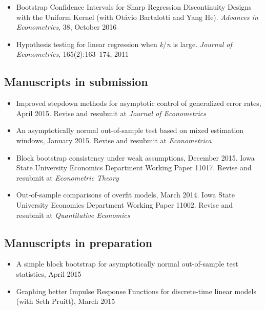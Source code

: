 \documentclass[12pt]{article}%
\begin{document}
\begin{itemize}
\item Bootstrap Confidence Intervals for Sharp Regression
Discontinuity Designs with the Uniform Kernel (with Ot\'avio Bartalotti
and Yang He). \textit{Advances in Econometrics}, 38, October 2016
\item Hypothesis testing for linear regression when
\textit{k}/\textit{n} is large. \textit{Journal of Econometrics},
165(2):163--174, 2011
\end{itemize}

\subsection*{Manuscripts in submission}

\begin{itemize}
\item Improved stepdown methods for asymptotic control of generalized
error rates, April 2015. Revise and resubmit at \textit{Journal of
Econometrics}
\item An asymptotically normal out-of-sample test based on mixed
estimation windows, January 2015. Revise and resubmit at
\textit{Econometrica}
\item Block bootstrap consistency under weak assumptions, December
2015.  Iowa State University Economics Department Working Paper
11017. Revise and resubmit at \textit{Econometric Theory}
\item Out-of-sample comparisons of overfit models, March 2014. Iowa
State University Economics Department Working Paper 11002. Revise and
resubmit at \textit{Quantitative Economics}
\end{itemize}

\subsection*{Manuscripts in preparation}
\begin{itemize}
\item A simple block bootstrap for asymptotically normal out-of-sample
  test statistics, April 2015
\item Graphing better Impulse Response Functions for discrete-time
  linear models (with Seth Pruitt), March 2015
\end{itemize}
\end{document}
